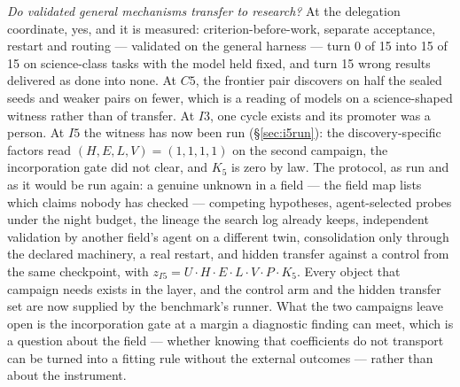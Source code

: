 \documentclass[11pt]{article}
\theoremstyle{definition}
\begin{document}
\emph{Do validated general mechanisms transfer to research?} At the delegation coordinate, yes, and it is measured: criterion-before-work, separate acceptance, restart and routing --- validated on the general harness --- turn 0 of 15 into 15 of 15 on science-class tasks with the model held fixed, and turn 15 wrong results delivered as done into none. At $C5$, the frontier pair discovers on half the sealed seeds and weaker pairs on fewer, which is a reading of models on a science-shaped witness rather than of transfer. At $I3$, one cycle exists and its promoter was a person. At $I5$ the witness has now been run (\S\ref{sec:i5run}): the discovery-specific factors read $(H,E,L,V) = (1,1,1,1)$ on the second campaign, the incorporation gate did not clear, and $K_5$ is zero by law. The protocol, as run and as it would be run again: a genuine unknown in a field --- the field map lists which claims nobody has checked --- competing hypotheses, agent-selected probes under the night budget, the lineage the search log already keeps, independent validation by another field's agent on a different twin, consolidation only through the declared machinery, a real restart, and hidden transfer against a control from the same checkpoint, with $z_{I5} = U \cdot H \cdot E \cdot L \cdot V \cdot P \cdot K_5$. Every object that campaign needs exists in the layer, and the control arm and the hidden transfer set are now supplied by the benchmark's runner. What the two campaigns leave open is the incorporation gate at a margin a diagnostic finding can meet, which is a question about the field --- whether knowing that coefficients do not transport can be turned into a fitting rule without the external outcomes --- rather than about the instrument.
\end{document}
